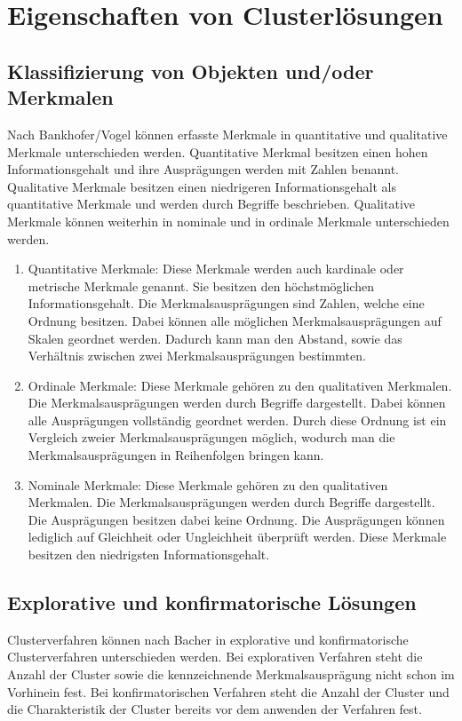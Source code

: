 \chapter{Eigenschaften von Clusterlösungen}

\section{Klassifizierung von Objekten und/oder Merkmalen}
Nach Bankhofer/Vogel \cite{Bankhofer.2008} können erfasste Merkmale in quantitative und qualitative Merkmale unterschieden werden.
Quantitative Merkmal besitzen einen hohen Informationsgehalt und ihre Ausprägungen werden mit Zahlen benannt. Qualitative Merkmale besitzen einen niedrigeren Informationsgehalt als quantitative Merkmale und werden durch Begriffe beschrieben. Qualitative Merkmale können weiterhin in nominale und in ordinale Merkmale unterschieden werden.

\begin{enumerate}
        \item Quantitative Merkmale: Diese Merkmale werden auch kardinale oder metrische Merkmale genannt. Sie besitzen den höchstmöglichen Informationsgehalt. Die Merkmalsausprägungen sind Zahlen, welche eine Ordnung besitzen. Dabei können alle möglichen Merkmalsausprägungen auf Skalen geordnet werden. Dadurch kann man den Abstand, sowie das Verhältnis zwischen zwei Merkmalsausprägungen bestimmten.
        \item Ordinale Merkmale: Diese Merkmale gehören zu den qualitativen Merkmalen. Die Merkmalsausprägungen werden durch Begriffe dargestellt. Dabei können alle Ausprägungen vollständig geordnet werden. Durch diese Ordnung ist ein Vergleich zweier Merkmalsausprägungen möglich, wodurch man die Merkmalsausprägungen in Reihenfolgen bringen kann.
        \item Nominale Merkmale: Diese Merkmale gehören zu den qualitativen Merkmalen. Die Merkmalsausprägungen werden durch Begriffe dargestellt. Die Ausprägungen besitzen dabei keine Ordnung. Die Ausprägungen können lediglich auf Gleichheit oder Ungleichheit überprüft werden. Diese Merkmale besitzen den niedrigsten Informationsgehalt.
\end{enumerate}

\section{Explorative und konfirmatorische Lösungen}
Clusterverfahren können nach Bacher \cite{Bacher.2010} in explorative und konfirmatorische Clusterverfahren unterschieden werden. 
Bei explorativen Verfahren steht die Anzahl der Cluster sowie die kennzeichnende Merkmalsausprägung nicht schon im Vorhinein fest.
Bei konfirmatorischen Verfahren steht die Anzahl der Cluster und die Charakteristik der Cluster bereits vor dem anwenden der Verfahren fest.

